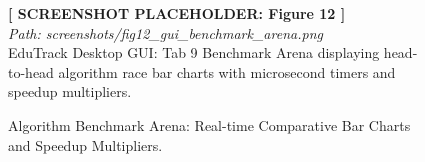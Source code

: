 \begin{figure}[H]
\centering
\begin{tcolorbox}[colback=white,colframe=codegray,width=0.92\textwidth,halign=center]
\vspace{0.8cm}
\textbf{[ SCREENSHOT PLACEHOLDER: Figure 12 ]}\\
\textit{Path: screenshots/fig12_gui_benchmark_arena.png}\\
\small EduTrack Desktop GUI: Tab 9 Benchmark Arena displaying head-to-head algorithm race bar charts with microsecond timers and speedup multipliers.
\vspace{0.8cm}
\end{tcolorbox}
\caption{Algorithm Benchmark Arena: Real-time Comparative Bar Charts and Speedup Multipliers.}
\label{fig:ss_benchmark_arena}
\end{figure}

